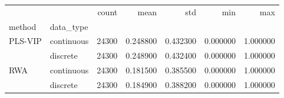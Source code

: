 \begin{tabular}{llrrrrr}
\toprule
 &  & count & mean & std & min & max \\
method & data_type &  &  &  &  &  \\
\midrule
\multirow[t]{2}{*}{PLS-VIP} & continuous & 24300 & 0.248800 & 0.432300 & 0.000000 & 1.000000 \\
 & discrete & 24300 & 0.248900 & 0.432400 & 0.000000 & 1.000000 \\
\cline{1-7}
\multirow[t]{2}{*}{RWA} & continuous & 24300 & 0.181500 & 0.385500 & 0.000000 & 1.000000 \\
 & discrete & 24300 & 0.184900 & 0.388200 & 0.000000 & 1.000000 \\
\cline{1-7}
\bottomrule
\end{tabular}
